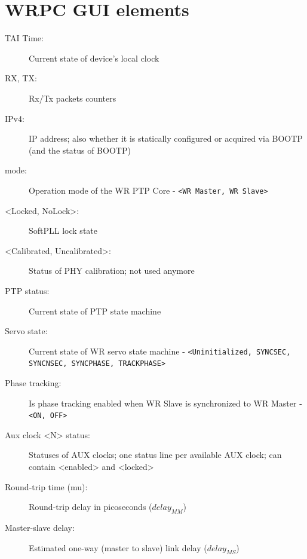 \documentclass[a4paper, 12pt]{article}
\renewcommand{\_}{\underscore\allowbreak}
\newcommand{\code}[1]{\texttt{#1}}
\begin{document}
\clearpage
\section{WRPC GUI elements}
\label{WRPC GUI elements}

\renewcommand{\descriptionlabel}[1]{\texttt{#1}}

\begin{description}

\item[TAI Time:] Current state of device's local clock

\item[RX, TX:] Rx/Tx packets counters

\item[IPv4:] IP address; also whether it is statically configured or
    acquired via BOOTP (and the status of BOOTP)

\item[mode:] Operation mode of the WR PTP Core - \code{<WR Master,
    WR Slave>}

\item[<Locked, NoLock>:] SoftPLL lock state

\item[<Calibrated, Uncalibrated>:] Status of PHY calibration; not used
    anymore

\item[PTP status:] Current state of PTP state machine

\item[Servo state:] Current state of WR servo state machine -
    \code{<Uninitialized, SYNC\_SEC, SYNC\_NSEC, SYNC\_PHASE, TRACK\_PHASE>}

\item[Phase tracking:] Is phase tracking enabled when WR Slave is
    synchronized to WR Master - \code{<ON, OFF>}

\item[Aux clock <N> status:] Statuses of AUX clocks; one status line per
    available AUX clock; can contain <enabled> and <locked>


\item[Round-trip time (mu):] Round-trip delay in picoseconds ($delay_{MM}$)

\item[Master-slave delay:] Estimated one-way (master to slave) link
    delay ($delay_{MS}$)


\end{description}
\end{document}
